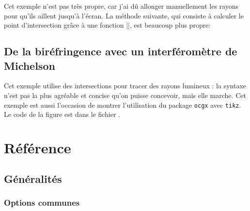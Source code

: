\documentclass[a4paper]{ltxdoc}
\begin{document}
  Cet exemple n'est pas très propre, car j'ai dû allonger manuellement les rayons pour qu'ils aillent jusqu'à l'écran. La méthode suivante, qui consiste à calculer le point d'intersection grâce à une fonction |\toVerticalProjection|, est beaucoup plus propre:

\begin{codeexample}[]
\end{codeexample}

\subsection{De la biréfringence avec un interféromètre de Michelson}



Cet exemple utilise des intersections pour tracer des rayons lumineux : la syntaxe n'est pas la plus agréable et concise qu'on puisse concevoir, mais elle marche.
Cet exemple est aussi l'occasion de montrer l'utilisation du package \texttt{ocgx} avec \texttt{tikz}.
Le code de la figure est dans le fichier .


\section{Référence}

\subsection{Généralités}

\subsubsection{Options communes}
\end{document}
